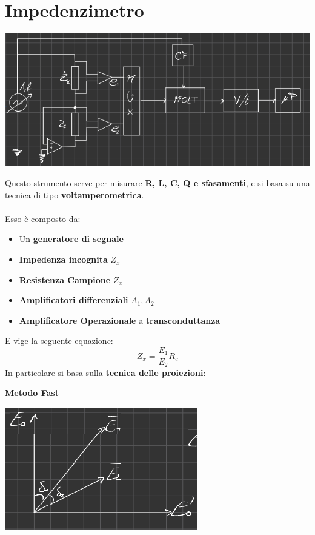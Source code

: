 \chapter{Impedenzimetro}
\begin{center}
    \includegraphics[width=\textwidth]{Images/figure40.png}
\end{center}
Questo strumento serve per misurare \textbf{R, L, C, Q e sfasamenti}, e si basa su una tecnica di tipo \textbf{voltamperometrica}.\\ \\
Esso è composto da:
\begin{itemize}
    \item Un \textbf{generatore di segnale}
    \item \textbf{Impedenza incognita} $Z_x$
    \item \textbf{Resistenza Campione }$Z_x$
    \item \textbf{Amplificatori differenziali} $A_1, A_2$
    \item \textbf{Amplificatore Operazionale} a \textbf{transconduttanza}
\end{itemize}
E vige la seguente equazione:
\begin{equation*}
        Z_x = \frac{E_1}{E_2}R_c
\end{equation*}
In particolare si basa sulla \textbf{tecnica delle proiezioni}:
\begin{center}
    \textbf{Metodo Fast}
\end{center}
\begin{center}
    \includegraphics[width=.4\textwidth]{Images/figure41.png}
\end{center}
